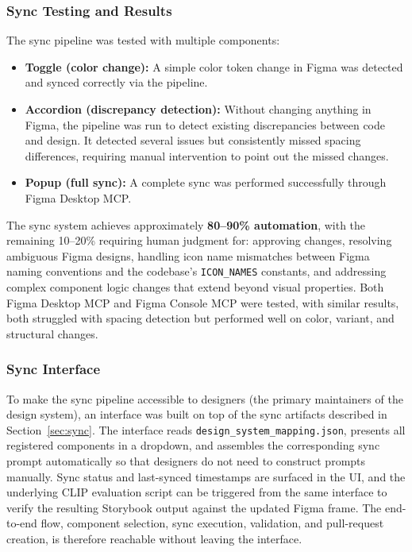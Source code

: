 \subsubsection{Sync Testing and Results}

The sync pipeline was tested with multiple components:

\begin{itemize}
    \item \textbf{Toggle (color change):} A simple color token change in Figma was detected and synced correctly via the pipeline.
    \item \textbf{Accordion (discrepancy detection):} Without changing anything in Figma, the pipeline was run to detect existing discrepancies between code and design. It detected several issues but consistently missed spacing differences, requiring manual intervention to point out the missed changes.
    \item \textbf{Popup (full sync):} A complete sync was performed successfully through Figma Desktop MCP.
\end{itemize}

The sync system achieves approximately \textbf{80--90\% automation}, with the remaining 10--20\% requiring human judgment for: approving changes, resolving ambiguous Figma designs, handling icon name mismatches between Figma naming conventions and the codebase's \texttt{ICON\_NAMES} constants, and addressing complex component logic changes that extend beyond visual properties. Both Figma Desktop MCP and Figma Console MCP were tested, with similar results, both struggled with spacing detection but performed well on color, variant, and structural changes.

\subsubsection{Sync Interface}

To make the sync pipeline accessible to designers (the primary maintainers of the design system), an interface was built on top of the sync artifacts described in Section~\ref{sec:sync}. The interface reads \texttt{design\_system\_mapping.json}, presents all registered components in a dropdown, and assembles the corresponding sync prompt automatically so that designers do not need to construct prompts manually. Sync status and last-synced timestamps are surfaced in the UI, and the underlying CLIP evaluation script can be triggered from the same interface to verify the resulting Storybook output against the updated Figma frame. The end-to-end flow, component selection, sync execution, validation, and pull-request creation, is therefore reachable without leaving the interface.


